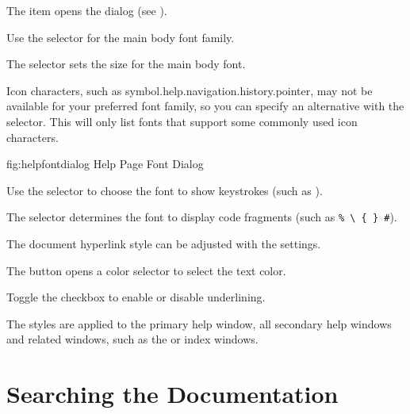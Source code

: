 The  item opens the
 dialog (see
). 


Use the  selector for the main body font
family.


The  selector sets the size for the
main body font. 


Icon characters, such as
\gls{symbol.help.navigation.history.pointer}, may not be available
for your preferred font family, so you can specify an alternative
with the  selector. This
will only list fonts that support some commonly used icon
characters.

\FloatFig
{fig:helpfontdialog}
{%
}
{Help Page Font Dialog}


Use the  selector to
choose the font to show keystrokes (such as
).


The  selector determines the
font to display code fragments (such as \verb|% \ { } #|).

The document hyperlink style can be adjusted with the 
 settings.


The  button opens a color
selector to select the text color.

Toggle the  checkbox to enable or
disable underlining.

The styles are applied to the primary help window, all secondary
help windows and related windows, such as the  
or index windows.

\section{Searching the Documentation}
\label{sec:helpsearch}

